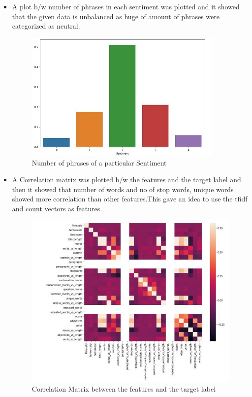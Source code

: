 \documentclass[12pt]{article}
\begin{document}
\begin{itemize}
    \item A plot b/w number of phrases in each sentiment was plotted and it showed that the given data is unbalanced as huge of amount of phrases were categorized as neutral.
    
    \begin{figure}[h!]
  \includegraphics[width=\linewidth]{EDA1.JPG}
  \caption{ Number of phrases of a particular Sentiment}
  \label{fig:Graph1}
\end{figure}


 \item A Correlation matrix was plotted b/w the features and the target label and then it showed that number of words and no of stop words, unique words showed more correlation than other features.This gave an idea to use the tfidf and count vectors as features. 
 
  \begin{figure}[h!]
  \includegraphics[width=\linewidth]{jj.JPG}
  \caption{ Correlation Matrix between the features and the target label}
  \label{fig:Graph1}
\end{figure}


\end{itemize}
\end{document}
